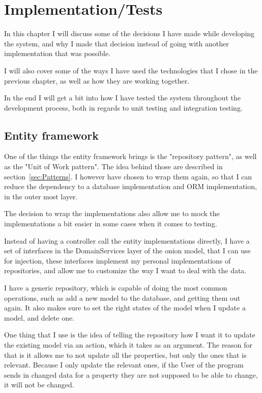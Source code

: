 \chapter{Implementation/Tests}
\label{chap:Implementation}

In this chapter I will discuss some of the decisions I have made while
developing the system, and why I made that decision instead of going with
another implementation that was possible.

I will also cover some of the ways I have used the technologies that I chose in
the previous chapter, as well as how they are working together.

In the end I will get a bit into how I have tested the system throughout the
development process, both in regards to unit testing and integration testing.

\section{Entity framework}
\label{sec:Entity framework}
One of the things the entity framework brings is the "repository pattern", as
well as the "Unit of Work pattern". The idea behind those are described in
section~\ref{sec:Patterns}. I however have chosen to wrap them again, so that I
can reduce the dependency to a database implementation and ORM implementation,
in the outer most layer. 

The decision to wrap the implementations also allow me to mock the
implementations a bit easier in some cases when it comes to testing. 

Instead of having a controller call the entity implementations directly, I have
a set of interfaces in the DomainServices layer of the onion model, that I can
use for injection, these interfaces implement my personal implementations of
repositories, and allow me to customize the way I want to deal with the data. 

I have a generic repository, which is capable of doing the most common
operations, such as add a new model to the database, and getting them out again.
It also makes sure to set the right states of the model when I update a model,
and delete one. 

One thing that I use is the idea of telling the repository how I want it to
update the existing model via an action, which it takes as an argument. The
reason for that is it allows me to not update all the properties, but only the
ones that is relevant. Because I only update the relevant ones, if the User of
the program sends in changed data for a property they are not supposed to be
able to change, it will not be changed. 

